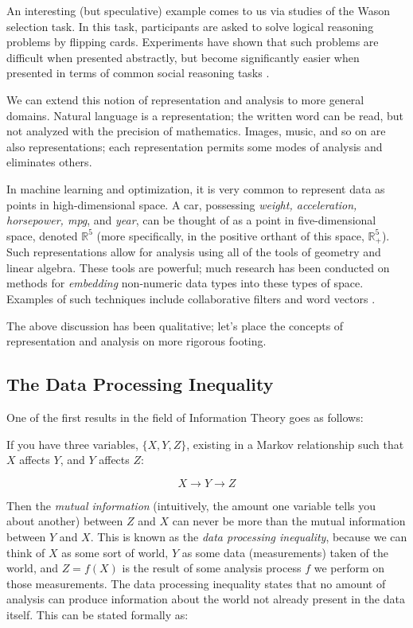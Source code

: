 \documentclass[12pt]{book}
\begin{document}
An interesting (but speculative) example comes to us via studies of the Wason selection task.
In this task, participants are asked to solve logical reasoning problems by flipping cards.
Experiments have shown that such problems are difficult when presented abstractly, but become significantly easier when presented in terms of common social reasoning tasks \cite{cosmides}.

\bigskip

We can extend this notion of representation and analysis to more general domains.
Natural language is a representation; the written word can be read, but not analyzed with the precision of mathematics.
Images, music, and so on are also representations; each representation permits some modes of analysis and eliminates others.

In machine learning and optimization, it is very common to represent data as points in high-dimensional space.
A car, possessing \textit{weight, acceleration, horsepower, mpg}, and \textit{year}, can be thought of as a point in five-dimensional space, denoted $\mathbb{R}^5$ (more specifically, in the positive orthant of this space, $\mathbb{R}^5_+$).
Such representations allow for analysis using all of the tools of geometry and linear algebra.
These tools are powerful; much research has been conducted on methods for \textit{embedding} non-numeric data types into these types of space.
Examples of such techniques include collaborative filters and word vectors \cite{mikolov} \cite{koren}.

The above discussion has been qualitative; let's place the concepts of representation and analysis on more rigorous footing.


\subsection{The Data Processing Inequality}

One of the first results in the field of Information Theory goes as follows:

If you have three variables, $\{X, Y, Z\}$, existing in a Markov relationship such that $X$ affects $Y$, and $Y$ affects $Z$:

\[
X \rightarrow Y \rightarrow Z
\]

Then the \textit{mutual information} (intuitively, the amount one variable tells you about another) between $Z$ and $X$ can never be more than the mutual information between $Y$ and $X$.
This is known as the \textit{data processing inequality}\cite{cover}, because we can think of $X$ as some sort of  world, $Y$ as some data (measurements) taken of the world, and $Z = f(X)$ is the result of some analysis process $f$ we perform on those measurements.
The data processing inequality states that no amount of analysis can produce information about the world not already present in the data itself. This can be stated formally as:
\end{document}
